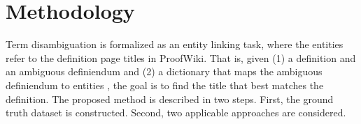 \section{Methodology}
\label{sec:methology}
Term disambiguation is formalized as an entity linking task, where the entities refer to the definition page titles in ProofWiki. That is, given (1) %
a definition and an ambiguous definiendum
and (2) a dictionary that maps the ambiguous definiendum to entities%
, the goal is to find the title that best matches the definition. The proposed method is described in two steps. First, the ground truth dataset is constructed. Second, two applicable approaches
are considered.
